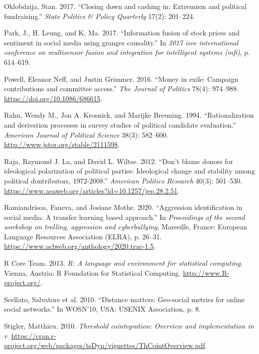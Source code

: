 \documentclass[12pt,]{article}
\begin{document}
\leavevmode\hypertarget{ref-oklobdzija2017}{}%
Oklobdzija, Stan. 2017. ``Closing down and cashing in: Extremism and
political fundraising.'' \emph{State Politics \& Policy Quarterly}
17(2): 201--224.

\leavevmode\hypertarget{ref-park2017}{}%
Park, J., H. Leung, and K. Ma. 2017. ``Information fusion of stock
prices and sentiment in social media using granger causality.'' In
\emph{2017 ieee international conference on multisensor fusion and
integration for intelligent systems (mfi)}, p. 614--619.

\leavevmode\hypertarget{ref-powell2016}{}%
Powell, Eleanor Neff, and Justin Grimmer. 2016. ``Money in exile:
Campaign contributions and committee access.'' \emph{The Journal of
Politics} 78(4): 974--988. \url{https://doi.org/10.1086/686615}.

\leavevmode\hypertarget{ref-rahn1994}{}%
Rahn, Wendy M., Jon A. Krosnick, and Marijke Breuning. 1994.
``Rationalization and derivation processes in survey studies of
political candidate evaluation.'' \emph{American Journal of Political
Science} 38(3): 582--600. \url{http://www.jstor.org/stable/2111598}.

\leavevmode\hypertarget{ref-laraja2012}{}%
Raja, Raymond J. La, and David L. Wiltse. 2012. ``Don't blame donors for
ideological polarization of political parties: Ideological change and
stability among political dontributors, 1972-2008.'' \emph{American
Politics Research} 40(3): 501--530.
\url{https://www.aeaweb.org/articles?id=10.1257/jep.28.2.51}.

\leavevmode\hypertarget{ref-ramiandrisoa2020}{}%
Ramiandrisoa, Faneva, and Josiane Mothe. 2020. ``Aggression
identification in social media: A transfer learning based approach.'' In
\emph{Proceedings of the second workshop on trolling, aggression and
cyberbullying}, Marseille, France: European Language Resources
Association (ELRA), p. 26--31.
\url{https://www.aclweb.org/anthology/2020.trac-1.5}.

\leavevmode\hypertarget{ref-r}{}%
R Core Team. 2013. \emph{R: A language and environment for statistical
computing}. Vienna, Austria: R Foundation for Statistical Computing.
\url{http://www.R-project.org/}.

\leavevmode\hypertarget{ref-scellato2010}{}%
Scellato, Salvatore et al. 2010. ``Distance matters: Geo-social metrics
for online social networks.'' In WOSN'10, USA: USENIX Association, p. 8.

\leavevmode\hypertarget{ref-tsdyn}{}%
Stigler, Matthieu. 2010. \emph{Threshold cointegration: Overview and
implementation in r}.
\url{https://cran.r-project.org/web/packages/tsDyn/vignettes/ThCointOverview.pdf}.
\end{document}
